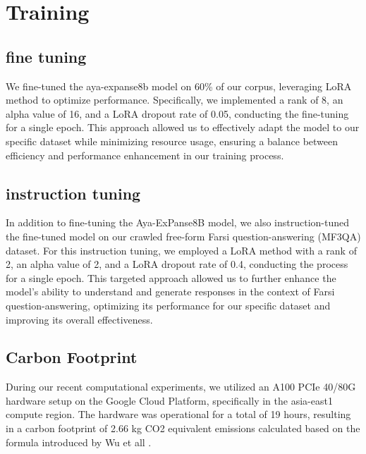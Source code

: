 \documentclass[conference]{IEEEtran}
\begin{document}
\section{Training}
\subsection{fine tuning}
We fine-tuned the aya-expanse8b model on 60\% of our corpus, leveraging LoRA
\cite{b12}
method to optimize performance. Specifically, we implemented a rank of 8, an alpha value of 16, and a LoRA dropout rate of 0.05, conducting the fine-tuning for a single epoch. This approach allowed us to effectively adapt the model to our specific dataset while minimizing resource usage, ensuring a balance between efficiency and performance enhancement in our training process.
\subsection{instruction tuning}
In addition to fine-tuning the Aya-ExPanse8B model, we also instruction-tuned the fine-tuned model on our crawled free-form Farsi question-answering (MF3QA) dataset. For this instruction tuning, we employed a LoRA method with a rank of 2, an alpha value of 2, and a LoRA dropout rate of 0.4, conducting the process for a single epoch. This targeted approach allowed us to further enhance the model’s ability to understand and generate responses in the context of Farsi question-answering, optimizing its performance for our specific dataset and improving its overall effectiveness.
\subsection{Carbon Footprint}
During our recent computational experiments, we utilized an A100 PCIe 40/80G hardware setup on the Google Cloud Platform, specifically in the asia-east1 compute region. The hardware was operational for a total of 19 hours, resulting in a carbon footprint of 2.66 kg CO2 equivalent emissions calculated  based on the formula introduced by Wu et all
\cite{b13}
.
\end{document}
